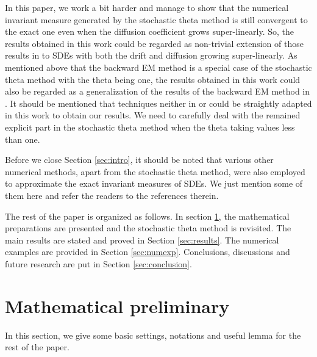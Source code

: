\documentclass{article}
\begin{document}
\par
In this paper, we work a bit harder and manage to show that the numerical invariant measure generated by the stochastic theta method is still convergent to the exact one even when the diffusion coefficient grows super-linearly. So, the results obtained in this work could be regarded as non-trivial extension of those results in \cite{JiangWengLiu2020} to SDEs with both the drift and diffusion growing super-linearly. As mentioned above that the backward EM method is a special case of the stochastic theta method with the theta being one, the results obtained in this work could also be regarded as a generalization of the results of the backward EM method in \cite{LiuMaoWu2023}. It should be mentioned that techniques neither in \cite{JiangWengLiu2020} or \cite{LiuMaoWu2023} could be straightly adapted in this work to obtain our results. We need to carefully deal with the remained explicit part in the stochastic theta method when the theta taking values less than one. 
\par
Before we close Section \ref{sec:intro}, it should be noted that various other numerical methods, apart from the stochastic theta method, were also employed to approximate the exact invariant measures of SDEs. We just mention some of them here \cite{BaoShaoYuan2016,LiMaoYin2019,LiuLiu2025,PangWangWu2024} and refer the readers to the references therein. 
\par
The rest of the paper is organized as follows. In section \ref{sec:preliminary}, the mathematical preparations are presented and the stochastic theta method is revisited. The main results are stated and proved in Section \ref{sec:results}. The numerical examples are provided in Section \ref{sec:numexp}. Conclusions, discussions and future research are put in Section \ref{sec:conclusion}.

\section{Mathematical preliminary}\label{sec:preliminary}
In this section, we give some basic settings, notations and useful lemma for the rest of the paper.
\end{document}
